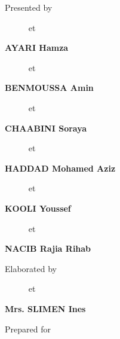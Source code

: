 \begin{center}
\textrm{Presented by }\\
\vskip0.3cm
{
    {%
        \begin{center}
            \large\textbf{\@author}~~~~~ et ~~~~~
            \large\textbf{\@secondAuthor}
        \end{center}
    }
    {\Large\textbf{AYARI Hamza}}%
}
\vskip0.3mm
{
    {%
        \begin{center}
            \large\textbf{\@author}~~~~~ et ~~~~~
            \large\textbf{\@secondAuthor}
        \end{center}
    }
    {\Large\textbf{BENMOUSSA Amin}}%
}
\vskip0.3mm
{
    {%
        \begin{center}
            \large\textbf{\@author}~~~~~ et ~~~~~
            \large\textbf{\@secondAuthor}
        \end{center}
    }
    {\Large\textbf{CHAABINI Soraya}}%
}
\vskip0.3mm
{
    {%
        \begin{center}
            \large\textbf{\@author}~~~~~ et ~~~~~
            \large\textbf{\@secondAuthor}
        \end{center}
    }
    {\Large\textbf{HADDAD Mohamed Aziz}}%
}
\vskip0.3mm
{
    {%
        \begin{center}
            \large\textbf{\@author}~~~~~ et ~~~~~
            \large\textbf{\@secondAuthor}
        \end{center}
    }
    {\Large\textbf{KOOLI Youssef}}%
}
\vskip0.3mm
{
    {%
        \begin{center}
            \large\textbf{\@author}~~~~~ et ~~~~~
            \large\textbf{\@secondAuthor}
        \end{center}
    }
    {\Large\textbf{NACIB Rajia Rihab}}%
}
\vskip5mm

\end{center}
\vskip8mm%

\begin{center}
\textrm{Elaborated by }\\
\vskip0.3cm
{
    {%
        \begin{center}
            \large\textbf{\@author}~~~~~ et ~~~~~
            \large\textbf{\@secondAuthor}
        \end{center}
    }
    {\Large\textbf{Mrs. SLIMEN Ines}}%
}

\vskip12mm

\end{center}
\vskip8mm%

\begin{center}
\large
Prepared for\\
\vskip0.4cm
\begin{figure}[h]
\centering
{}
\end{figure}
\end{center}

\afterpage{\blankpage}